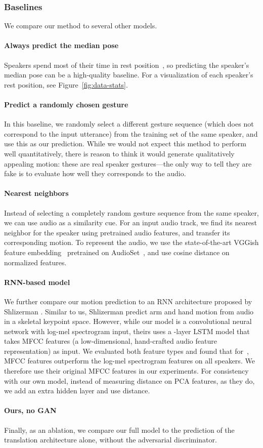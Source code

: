 \documentclass[10pt,twocolumn,letterpaper]{article}
\newcommand{\mypar}[1]{\vspace{-2mm}\paragraph{#1}}
\begin{document}
\subsubsection{Baselines}
\label{sec:baselines}
We compare our method to several other models. 
\vspace{-3mm}
\mypar{Always predict the median pose} Speakers spend most of their time in rest position~\cite{kendon_2004}, so predicting the speaker's median pose can be a high-quality baseline. For a visualization of each speaker's rest position, see Figure~\ref{fig:data-stats}.
\vspace{-3mm}
\mypar{Predict a randomly chosen gesture} In this baseline, we randomly select a different gesture sequence (which does not correspond to the input utterance) from the training set of the same speaker, and use this as our prediction. While we would not expect this method to perform well quantitatively, there is reason to think it would generate qualitatively appealing motion: these are real speaker gestures---the only way to tell they are fake is to evaluate how well they corresponds to the audio.
\vspace{-3mm}
\mypar{Nearest neighbors} Instead of selecting a completely random gesture sequence from the same speaker, we can use audio as a similarity cue. For an input audio track, we find its nearest neighbor for the speaker using pretrained audio features, and transfer its corresponding motion. To represent the audio, we use the state-of-the-art VGGish feature embedding~\cite{vggish} pretrained on AudioSet~\cite{gemmeke2017audio}, and use cosine distance on normalized features. 
\vspace{-3mm}
\mypar{RNN-based model~\cite{shlizermanaudio}} We further compare our motion prediction to an RNN architecture proposed by Shlizerman \etal. Similar to us, Shlizerman \etal predict arm and hand motion from audio in a  skeletal keypoint space. However, while our model is a convolutional neural network with log-mel spectrogram input, theirs uses a 
-layer LSTM model that takes MFCC features (a low-dimensional, hand-crafted audio feature representation) as input.
We evaluated both feature types and found that for~\cite{shlizermanaudio}, MFCC features outperform the log-mel spectrogram features on all speakers. We therefore use their original MFCC features in our experiments.
For consistency with our own model, instead of measuring  distance on PCA features, as they do, we add an extra hidden layer and use  distance.
\vspace{-3mm}
\mypar{Ours, no GAN} Finally, as an ablation, we compare our full model to the prediction of the translation architecture alone, without the adversarial discriminator.
\end{document}
